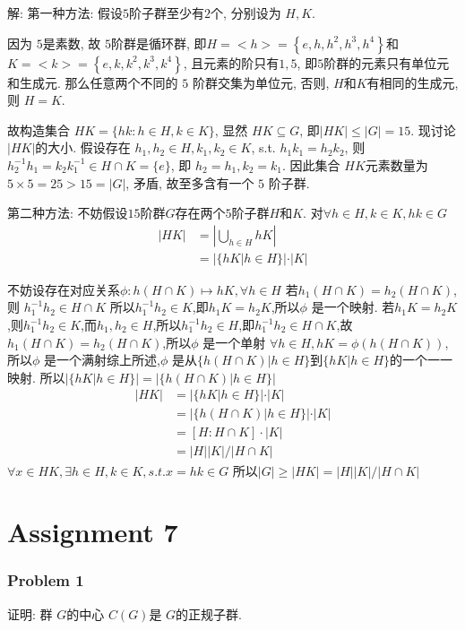 \documentclass[a4paper,12pt]{ctexart}
\begin{document}
  解: 第一种方法: 假设$5$阶子群至少有$2$个, 分别设为 $H,K$. 
  
  因为 $ 5 $是素数, 故 $ 5 $阶群是循环群, 即$H=<h>=\left\{ e,h,h^2,h^3,h^4 \right\}$和$K=<k>=\left\{ e,k,k^2,k^3,k^4 \right\}$, 且元素的阶只有$1,5$, 即$5$阶群的元素只有单位元和生成元. 
  那么任意两个不同的 $ 5 $ 阶群交集为单位元, 否则, $H$和$K$有相同的生成元, 则 $H=K$. 

  故构造集合 $ HK=\{hk: h\in H,k\in K\} $, 显然 $ HK\subseteq G $, 即$|HK|\le|G|=15$. 
  现讨论$|HK|$的大小. 假设存在 $ h_1,h_2\in H,k_1,k_2\in K $, 
  s.t. $ h_1k_1=h_2k_2 $, 则 $ h_2^{-1}h_1=k_2k_1^{-1}\in H\cap K=\{e\} $, 即 $ h_2=h_1,k_2=k_1 $. 因此集合  $ HK $元素数量为 $ 5\times 5=25>15=|G| $, 矛盾, 故至多含有一个 $ 5 $ 阶子群.

  第二种方法:   不妨假设$15$阶群$G$存在两个$5$阶子群$H$和$K$. 
  对$\forall h\in H,k \in K,hk \in G$
  \begin{align*}
  |HK| &= |\bigcup_{h \in H} hK | \\
  &= |\{hK|h\in H\}|\cdot |K| 
  \end{align*}
  
  不妨设存在对应关系$\phi :h(H\cap K) \longmapsto hK,\forall h \in H$
  若$h_1(H\cap K) = h_2(H \cap K)$,则 $h_1^{-1}h_2 \in H \cap K$
  所以$h_1^{-1}h_2 \in K$,即$h_1K = h_2K$,所以$\phi$ 是一个映射.
  若$h_1K = h_2K$,则$h_1^{-1}h_2 \in K$,而$h_1,h_2 \in H$,所以$h_1^{-1}h_2 \in H$,即$h_1^{-1}h_2 \in H \cap K$,故 $h_1(H\cap K) = h_2(H \cap K)$,所以$\phi$ 是一个单射
  $\forall h \in H,hK = \phi (h(H\cap K))$,所以$\phi$ 是一个满射$
  $综上所述,$\phi$ 是从$\{h(H \cap K)| h \in H\}$到$\{hK|h \in H\}$的一个一一映射.
  所以$|\{hK|h\in H\}| = |\{h(H \cap K)| h \in H\}|$
  \begin{align*}
  |HK| &= |\{hK|h\in H\}|\cdot |K|\\
  &= |\{h(H \cap K)| h \in H\}| \cdot |K|\\
  &= [H:H \cap K] \cdot |K| \\ 
  &= |H||K|/|H \cap K|
  \end{align*}
  $\forall x \in HK, \exists h \in H,k \in K,s.t. x = hk \in G$
  所以$|G| \geq |HK| = |H||K|/|H \cap K|$
\section*{Assignment 7}
  \subsubsection*{Problem 1}
  证明: 群 $ G $的中心 $ C(G) $是 $ G $的正规子群.      
  
\end{document}
